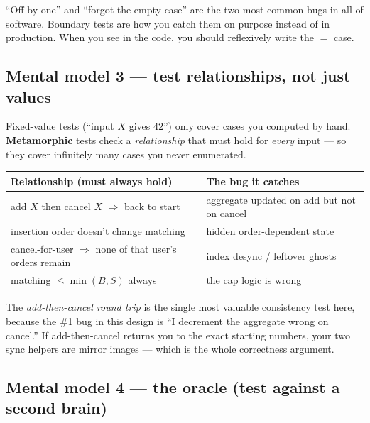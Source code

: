 \begin{intu}
``Off-by-one'' and ``forgot the empty case'' are the two most common bugs in all
of software. Boundary tests are how you catch them on purpose instead of in
production. When you see \code{>=} in the code, you should reflexively write the
$=$ case.
\end{intu}

\subsection{Mental model 3 --- test relationships, not just values}

Fixed-value tests (``input $X$ gives $42$'') only cover cases you computed by hand.
\textbf{Metamorphic} tests check a \emph{relationship} that must hold for
\emph{every} input --- so they cover infinitely many cases you never enumerated.

\begin{center}
\renewcommand{\arraystretch}{1.3}\footnotesize
\begin{tabular}{@{}p{5.0cm}p{8.3cm}@{}}
\toprule
\textbf{Relationship (must always hold)} & \textbf{The bug it catches} \\
\midrule
add $X$ then cancel $X$ $\Rightarrow$ back to start & aggregate updated on add but not on cancel \\
insertion order doesn't change matching & hidden order-dependent state \\
cancel-for-user $\Rightarrow$ none of that user's orders remain & index desync / leftover ghosts \\
matching $\le \min(B,S)$ always & the cap logic is wrong \\
\bottomrule
\end{tabular}
\end{center}

\begin{intu}
The \emph{add-then-cancel round trip} is the single most valuable consistency test
here, because the \#1 bug in this design is ``I decrement the aggregate wrong on
cancel.'' If add-then-cancel returns you to the exact starting numbers, your two
sync helpers are mirror images --- which is the whole correctness argument.
\end{intu}

\subsection{Mental model 4 --- the oracle (test against a second brain)}

